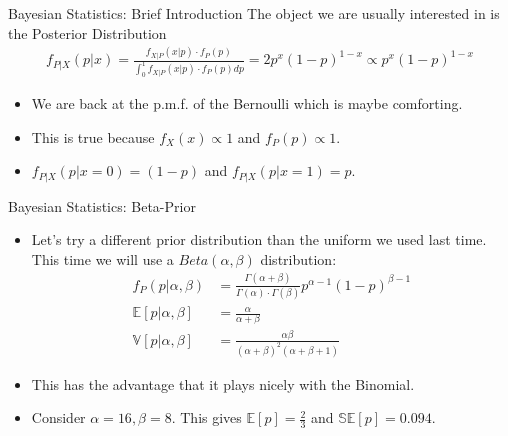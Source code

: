 \documentclass[aspectratio=169]{beamer}
\begin{document}
\begin{frame}{Bayesian Statistics: Brief Introduction}
The object we are usually interested in is the \alert{Posterior Distribution}
\begin{align*}
f _ { P | X } ( p | x ) = \frac { f _ { X | P } ( x | p ) \cdot f _ { P } ( p ) } { \int _ { 0 } ^ { 1 } f _ { X | P } ( x | p ) \cdot f _ { P } ( p ) d p } = 2 p ^ { x } ( 1 - p ) ^ { 1 - x } \propto p ^ { x } ( 1 - p ) ^ { 1 - x }
\end{align*}
\begin{itemize}
\item We are back at the p.m.f. of the \alert{Bernoulli} which is maybe comforting.\\
\item This is true because $f_X(x) \propto 1$ and $f_P(p) \propto 1$.
\item $f _ { P | X } ( p | x=0) = (1-p)$ and $f _ { P | X } ( p | x =1)=p$.
\end{itemize}
\end{frame}

\begin{frame}{Bayesian Statistics: Beta-Prior}
\begin{itemize}
\item Let's try a different \alert{prior distribution} than the uniform we used last time. This time we will use a $Beta(\alpha,\beta)$ distribution:
\begin{align*}
f _ { P } ( p | \alpha,\beta) &= \frac { \Gamma ( \alpha + \beta ) } { \Gamma ( \alpha ) \cdot \Gamma ( \beta ) } p ^ { \alpha - 1 } ( 1 - p ) ^ { \beta - 1 }\\
\mathbb{E}[p | \alpha,\beta] &=\frac{\alpha}{\alpha + \beta}\\
\mathbb{V}[p | \alpha,\beta] &=\frac{\alpha \beta}{(\alpha + \beta)^2(\alpha+\beta+1)}
\end{align*}
\item This has the advantage that it plays nicely with the Binomial.
\item Consider $\alpha=16, \beta=8$. This gives $\mathbb{E}[p ] = \frac{2}{3}$ and $\mathbb{SE}[p] = 0.094$. 
\end{itemize}
\end{frame}
\end{document}
